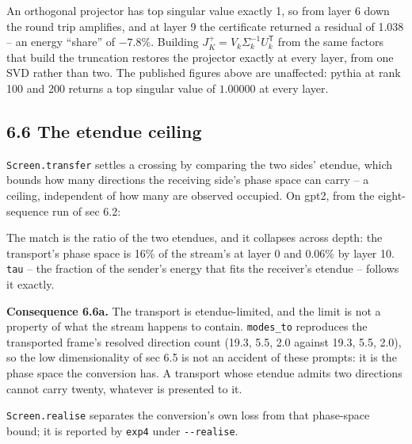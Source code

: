 \documentclass[10pt,letterpaper,twocolumn]{article}
\begin{document}
An orthogonal projector has top singular value exactly 1, so from layer 6 down the round trip
amplifies, and at layer 9 the certificate returned a residual of 1.038 -- an energy ``share'' of
\(-7.8\%\). Building \(J_K^+ = V_k\Sigma_k^{-1}U_k^{\mathsf T}\) from the same factors that build the
truncation restores the projector exactly at every layer, from one SVD rather than two. The
published figures above are unaffected: pythia at rank 100 and 200 returns a top singular value of
\(1.00000\) at every layer.

\subsection{6.6 The etendue ceiling}\label{66-the-etendue-ceiling}

\texttt{Screen.\allowbreak{}transfer} settles a crossing by comparing the two sides' etendue, which bounds how many directions the receiving side's phase space can carry -- a ceiling, independent of how many are observed occupied. On gpt2, from the eight-sequence run of sec 6.2:


The match is the ratio of the two etendues, and it collapses across depth: the transport's phase space is 16\% of the stream's at layer 0 and 0.06\% by layer 10. \texttt{tau} -- the fraction of the sender's energy that fits the receiver's etendue -- follows it exactly.

\textbf{Consequence 6.6a.} The transport is etendue-limited, and the limit is not a property of what the stream happens to contain. \texttt{modes\_\allowbreak{}to} reproduces the transported frame's resolved direction count (19.3, 5.5, 2.0 against 19.3, 5.5, 2.0), so the low dimensionality of sec 6.5 is not an accident of these prompts: it is the phase space the conversion has. A transport whose etendue admits two directions cannot carry twenty, whatever is presented to it.

\texttt{Screen.\allowbreak{}realise} separates the conversion's own loss from that phase-space bound; it is reported by \texttt{exp4} under \texttt{-{}\allowbreak{}-{}\allowbreak{}realise}.
\end{document}
